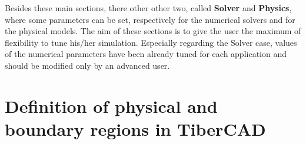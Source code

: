 Besides these  main  sections, there  other  other  two,  called  \textbf{Solver} and  \textbf{Physics},  where  some  parameters can  be  set,  respectively  for the  numerical solvers and  for  the  physical  models.
The  aim  of  these  sections is  to  give  the user the  maximum  of  flexibility to  tune his/her  simulation.
Especially  regarding  the  Solver  case,  values  of  the  numerical  parameters  have  been already  tuned for  each  application and   should  be  modified only  by an  advanced  user. 







% 
% 
% 
% 




\section{Definition of physical and boundary regions in  TiberCAD{} }

